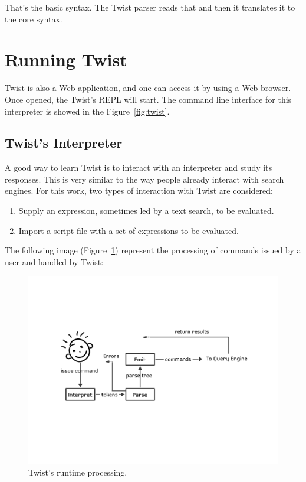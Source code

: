 That's the basic syntax. The Twist parser reads that and then it translates it to the core syntax.

\section{Running Twist}
\label{sec:running}

Twist is also a Web application, and one can access it by using a Web browser. Once opened, the Twist's REPL will start. The command line interface for this interpreter is showed in the Figure~\ref{fig:twist}. 

\subsection{Twist's Interpreter}
\label{sec:interpreter}

A good way to learn Twist is to interact with an interpreter and study its responses. This is very similar to the way people already interact with search engines. For this work, two types of interaction with Twist are considered: 

\begin{enumerate}
	\item Supply an expression, sometimes led by a text search, to be evaluated.
	\item Import a script file with a set of expressions to be evaluated. 
\end{enumerate}	

The following image (Figure~\ref{fig:runtime}) represent the processing of commands issued by a user and handled by Twist:

\begin{figure}[!ht]
    \centering
    \includegraphics[width=\textwidth]{images/runtime}
    \caption{Twist's runtime processing.}
    \label{fig:runtime}
\end{figure} 

